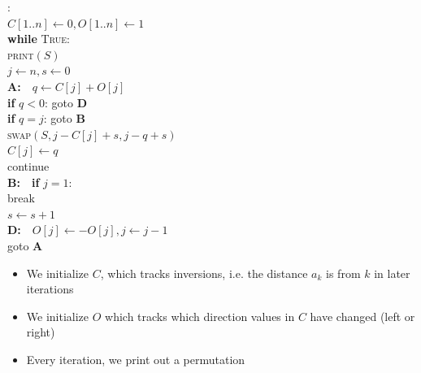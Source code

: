 \documentclass[aspectratio=169]{beamer}
\begin{document}
\begin{frame}{}
\begin{minipage}[c]{0.6\textwidth}
\begin{nalgo}
:
\\\label{}  $C[1..n] \gets 0, O[1..n] \gets 1$
\\\label{}  \textbf{while} \textsc{True}:\+
\\\label{}      \textsc{print}$(S)$
\\\label{}      {\color{lightgray}$j \gets n, s \gets 0$}
\\\label{}      {\color{lightgray}\textbf{A:}~~$q \gets C[j] + O[j]$\+}
\\\label{}          {\color{lightgray}\textbf{if} $q < 0$: goto \textbf{D}}
\\\label{}          {\color{lightgray}\textbf{if} $q = j$: goto \textbf{B}}
\\\label{}          {\color{lightgray}\textsc{swap}$(S, j-C[j]+s, j-q+s)$}
\\\label{}          {\color{lightgray}$C[j] \gets q$} 
\\\label{}          {\color{lightgray}continue\-}
\\\label{}      {\color{lightgray}\textbf{B:}~~\textbf{if} $j=1$:\+\+}
\\\label{}              {\color{lightgray}break\-}
\\\label{}          {\color{lightgray}$s \gets s+1$\-}
\\\label{}    {\color{lightgray}\textbf{D:}~~$O[j] \gets -O[j], j \gets j-1$\+}
\\\label{}      {\color{lightgray}goto \textbf{A}}
\end{nalgo}
\end{minipage}
\begin{minipage}[c]{0.35\textwidth}
\begin{itemize}
    \item We initialize $C$, which tracks inversions, i.e. the distance $a_k$ is from $k$ in later iterations \pause
    \item We initialize $O$ which tracks which direction values in $C$ have changed (left or right) \pause
    \item Every iteration, we print out a permutation
\end{itemize}
\end{minipage}
\end{frame}
\end{document}
